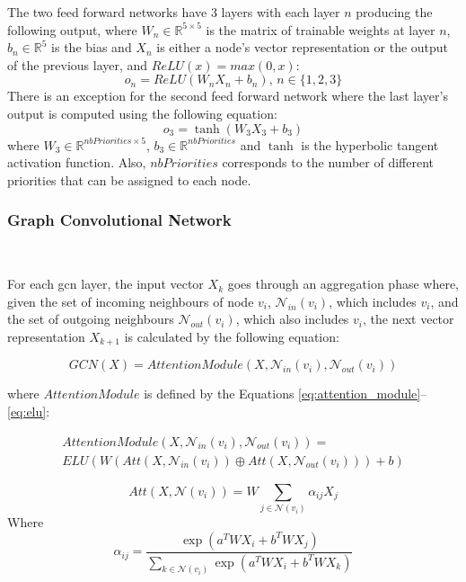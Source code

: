 The two feed forward networks have 3 layers with each 
layer $n$ producing the following output,
where $W_n \in \mathbb{R}^{5\times5}$ is the matrix of trainable weights
at layer $n$, $b_n \in \mathbb{R}^5$ is the bias and $X_n$ is either a node's vector representation
or the output of the previous layer, and $ReLU(x) = max(0, x)$:
\begin{equation}
    o_{n} = ReLU(W_{n}X_{n} + b_n),\, n \in \{1,2,3\}
\end{equation}
There is an exception for the second feed forward network where the last 
layer's output is computed using the following equation:
\begin{equation}
    o_{3} = \tanh(W_{3}X_{3} + b_3)
\end{equation}
where $W_3 \in \mathbb{R}^{nbPriorities \times 5}$,
$b_3 \in \mathbb{R}^{nbPriorities}$ and $\tanh$ is the 
hyperbolic tangent activation function.
Also, $nbPriorities$ corresponds to the number of different priorities
that can be assigned to each node.


\subsubsection{Graph Convolutional Network}
~

For each gcn layer, the input vector $X_k$ 
goes through an aggregation phase where,
given the set of incoming neighbours of node $v_i$, $\mathcal{N}_{in}(v_i)$, which includes
$v_i$, and the set of outgoing neighbours $\mathcal{N}_{out}(v_i)$, which also includes $v_i$,
the next vector representation $X_{k+1}$ is calculated by the following equation:

\begin{equation}
GCN(X) = AttentionModule(X, \mathcal{N}_{in}(v_i), \mathcal{N}_{out}(v_i))
\end{equation}

where $AttentionModule$ is defined by the Equations \ref{eq:attention_module}--\ref{eq:elu}:

\begin{multline}
    AttentionModule(X, \mathcal{N}_{in}(v_i), \mathcal{N}_{out}(v_i)) = \\
    ELU\left( W \left( Att(X, \mathcal{N}_{in}(v_i)) \oplus Att(X, \mathcal{N}_{out}(v_i)) \right) + b \right)
    \label{eq:attention_module}
\end{multline}

\begin{equation}
Att(X, \mathcal{N}(v_i)) = W\sum_{j \in \mathcal{N}(v_i)} \alpha_{ij} X_j
\label{eq:attention_submodule}
\end{equation}
Where 
\begin{equation}
    \alpha_{ij} = \frac{\exp \left ({ a ^{T} W X_{i} + b ^{T} W X_{j} }\right )}
    {{\sum _{k \in \mathcal {N}(v_{i})}} \exp \left ({ a ^{T} W X_{i} + b ^{T} W X_{k} }\right )}
\end{equation}

